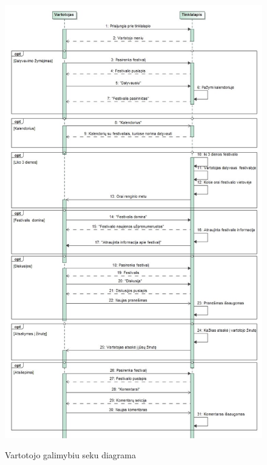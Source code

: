 ﻿\documentclass{VUMIFPSkursinis}
\begin{document}
\begin{figure}[H]
    \centering
    \includegraphics[scale=0.5]{img/geri/KlientFun}
    \label{img:uml25}
	\caption{Vartotojo galimybiu seku diagrama}
\end{figure}
\end{document}
